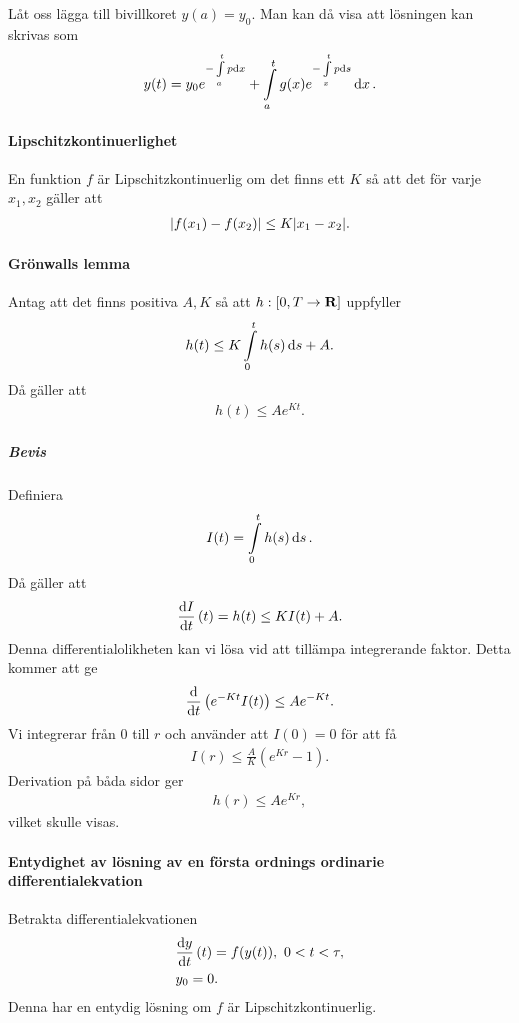 Låt oss lägga till bivillkoret $y(a) = y_0$. Man kan då visa att lösningen kan skrivas som
\begin{align*}
	y(t) = y_0e^{-\int\limits_{a}^{t}p\dd{x}} + \int\limits_{a}^{t}g(x)e^{-\int\limits_{x}^{t}p\dd{s}}\dd{x}.
\end{align*}

\paragraph{Lipschitzkontinuerlighet}
En funktion $f$ är Lipschitzkontinuerlig om det finns ett $K$ så att det för varje $x_1, x_2$ gäller att
\begin{align*}
	\abs{f(x_1) - f(x_2)} \leq K\abs{x_1 - x_2}.
\end{align*}

\paragraph{Grönwalls lemma}
Antag att det finns positiva $A, K$ så att $h: [0, T\to\mathbf{R}]$ uppfyller
\begin{align*}
	h(t) \leq K\int\limits_{0}^{t}h(s)\dd{s} + A.
\end{align*}
Då gäller att
\begin{align*}
	h(t) \leq Ae^{Kt}.
\end{align*}

\subparagraph{Bevis}
Definiera
\begin{align*}
	I(t) = \int\limits_{0}^{t}h(s)\dd{s}.
\end{align*}
Då gäller att
\begin{align*}
	\dv{I}{t} \left(t\right) = h(t) \leq KI(t) + A.
\end{align*}
Denna differentialolikheten kan vi lösa vid att tillämpa integrerande faktor. Detta kommer att ge
\begin{align*}
	\dv{t}\left(e^{-Kt}I(t)\right) \leq Ae^{-Kt}.
\end{align*}
Vi integrerar från $0$ till $r$ och använder att $I(0) = 0$ för att få
\begin{align*}
	I(r) \leq \frac{A}{K}(e^{Kr} - 1).
\end{align*}
Derivation på båda sidor ger
\begin{align*}
	h(r) \leq Ae^{Kr},
\end{align*}
vilket skulle visas.

\paragraph{Entydighet av lösning av en första ordnings ordinarie differentialekvation}
Betrakta differentialekvationen
\begin{align*}
	&\dv{y}{t} \left(t\right) = f(y(t)),\ 0 < t < \tau, \\
	&y_0 = 0.
\end{align*}
Denna har en entydig lösning om $f$ är Lipschitzkontinuerlig.


